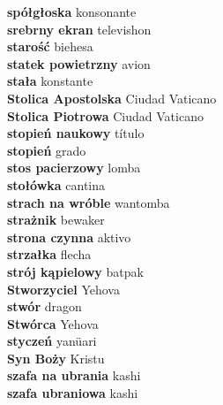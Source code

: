\textbf{ spółgłoska  } konsonante \\
\textbf{ srebrny ekran  } televishon \\
\textbf{ starość  } biehesa \\
\textbf{ statek powietrzny  } avion \\
\textbf{ stała  } konstante \\
\textbf{ Stolica Apostolska  } Ciudad Vaticano \\
\textbf{ Stolica Piotrowa  } Ciudad Vaticano \\
\textbf{ stopień naukowy  } título \\
\textbf{ stopień  } grado \\
\textbf{ stos pacierzowy  } lomba \\
\textbf{ stołówka  } cantina \\
\textbf{ strach na wróble  } wantomba \\
\textbf{ strażnik  } bewaker \\
\textbf{ strona czynna  } aktivo \\
\textbf{ strzałka  } flecha \\
\textbf{ strój kąpielowy  } batpak \\
\textbf{ Stworzyciel  } Yehova \\
\textbf{ stwór  } dragon \\
\textbf{ Stwórca  } Yehova \\
\textbf{ styczeń  } yanüari \\
\textbf{ Syn Boży  } Kristu \\
\textbf{ szafa na ubrania  } kashi \\
\textbf{ szafa ubraniowa  } kashi \\

